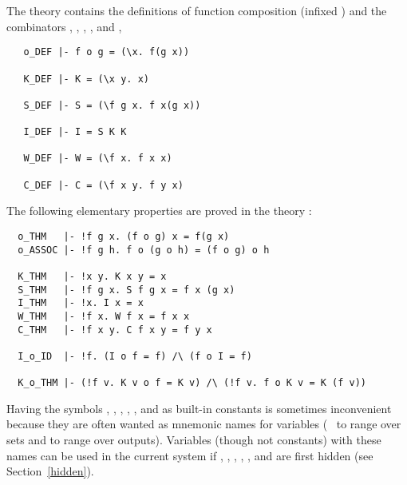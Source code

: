 The theory 
contains the definitions of function composition (infixed )
and the combinators
,
,
,
,
and ,

\begin{hol}
{\small
\begin{verbatim}
   o_DEF |- f o g = (\x. f(g x))

   K_DEF |- K = (\x y. x)

   S_DEF |- S = (\f g x. f x(g x))

   I_DEF |- I = S K K

   W_DEF |- W = (\f x. f x x)

   C_DEF |- C = (\f x y. f y x)
\end{verbatim}
}
\end{hol}

\noindent The following elementary properties are proved in the theory
:

\begin{hol}
\begin{verbatim}
  o_THM   |- !f g x. (f o g) x = f(g x)
  o_ASSOC |- !f g h. f o (g o h) = (f o g) o h

  K_THM   |- !x y. K x y = x
  S_THM   |- !f g x. S f g x = f x (g x)
  I_THM   |- !x. I x = x
  W_THM   |- !f x. W f x = f x x
  C_THM   |- !f x y. C f x y = f y x

  I_o_ID  |- !f. (I o f = f) /\ (f o I = f)

  K_o_THM |- (!f v. K v o f = K v) /\ (!f v. f o K v = K (f v))
\end{verbatim}
\end{hol}

Having the symbols , , , , , and 
as built-in constants
is sometimes inconvenient because they are often wanted
as mnemonic names for variables (\eg\  to range over sets and
 to range over outputs).  Variables (though not constants) with
these names can be used in the current system if , , ,
, , and  are first hidden (see Section~\ref{hidden}).
%


